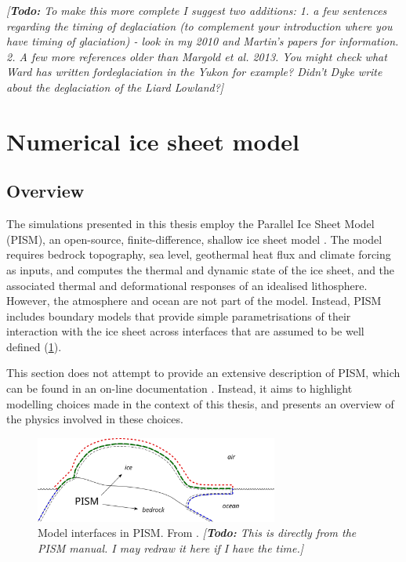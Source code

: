 \documentclass{article}
\newcommand{\todo}[1]{\emph{[\textbf{Todo:} #1]}}
\begin{document}
\todo{To make this more complete I suggest two additions: 1. a few sentences regarding the timing of deglaciation (to complement your introduction where you have timing of glaciation) - look in my 2010 and Martin's papers for information. 2. A few more references older than Margold et al. 2013. You might check what Ward has written fordeglaciation in the Yukon for example? Didn't Dyke write about the deglaciation of the Liard Lowland?}

\section{Numerical ice sheet model}

\subsection{Overview}

The simulations presented in this thesis employ the Parallel Ice Sheet Model (PISM),
an open-source, finite-difference, shallow ice sheet model
\citep{PISM-authors.2014}. The model requires bedrock topography, sea level,
geothermal heat flux and climate forcing as inputs, and computes the thermal
and dynamic state of the ice sheet, and the associated thermal and
deformational responses of an idealised lithosphere. However, the atmosphere and ocean
are not part of the model. Instead, PISM includes boundary models
that provide simple parametrisations of their interaction with the ice sheet across interfaces that are assumed to be well defined (\cref{fig:model-interfaces}).

This section does not attempt to provide an extensive description of PISM,
which can be found in an on-line documentation \citep{PISM-authors.2014}.
Instead, it aims to highlight modelling choices made in the context of this
thesis, and presents an overview of the physics involved in these choices.

\begin{figure}
  \centering
  \includegraphics[width=80mm]{model-interfaces}
  \caption{Model interfaces in PISM. From \citet{PISM-authors.2014}.
           \todo{This is directly from the PISM manual. I may redraw it here
                 if I have the time.}}
  \label{fig:model-interfaces}
\end{figure}
\end{document}

